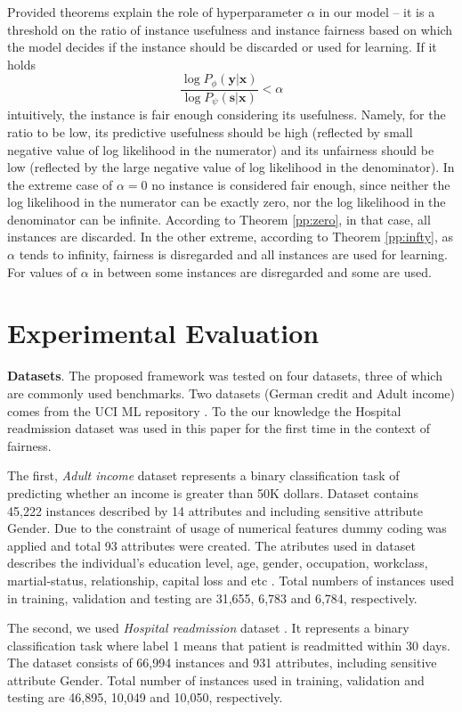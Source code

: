 \documentclass[preprint,12pt]{elsarticle}
\begin{document}
Provided theorems explain the role of hyperparameter $\alpha$ in our model -- it is a threshold on the ratio of instance usefulness and instance fairness based on which the model decides if the instance should be discarded or used for learning.
If it holds
$$\frac{\log P_{\phi}(\mathbf{y}|\mathbf{x})}{\log P_{\psi}(\mathbf{s}|\mathbf{x})}<\alpha$$
intuitively, the instance is fair enough considering its usefulness. Namely, for the ratio to be low, its predictive usefulness should be high (reflected by small negative value of log likelihood in the numerator) and its unfairness should be low (reflected by the large negative value of log likelihood in the denominator). In the extreme case of $\alpha=0$ no instance is considered fair enough, since neither the log likelihood in the numerator can be exactly zero, nor the log likelihood in the denominator can be infinite. According to Theorem \ref{pp:zero}, in that case, all instances are discarded. In the other extreme, according to Theorem \ref{pp:infty}, as $\alpha$ tends to infinity,  fairness is disregarded and all instances are used for learning. For values of $\alpha$ in between some instances are disregarded and some are used.


\section{Experimental Evaluation}
\label{Sec:exp-evaluation}

\textbf{Datasets}. The proposed framework was tested on four datasets, three of which are commonly used benchmarks. Two datasets (German credit and Adult income) comes from the UCI ML repository \cite{frank2011uci}. To the our knowledge the Hospital readmission dataset was used in this paper for the first time in the context of fairness.

The first, \textit{Adult income} dataset \cite{kohavi1996scaling} represents a binary classification task of predicting whether an income is greater than 50K dollars. Dataset contains 45,222 instances described by 14 attributes and including sensitive attribute Gender. Due to the constraint of usage of numerical features dummy coding was applied and total 93 attributes were created. The atributes used in dataset describes the individual's education level, age, gender, occupation, workclass, martial-status, relationship, capital loss and etc \cite{Dua:2019}. Total numbers of instances used in training, validation and testing are 31,655, 6,783 and 6,784, respectively.

The second, we used \textit{Hospital readmission} dataset \cite{stiglic2015comprehensible}. It represents a binary classification task where label 1 means that patient is readmitted within 30 days. The dataset consists of 66,994 instances and 931 attributes, including sensitive attribute Gender. Total number of instances used in training, validation and testing are 46,895, 10,049 and 10,050, respectively.
\end{document}
